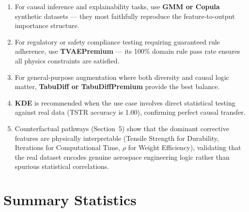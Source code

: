 \documentclass[12pt,a4paper]{article}
\begin{document}
\begin{enumerate}[leftmargin=1.5cm]
  \item For causal inference and explainability tasks, use \textbf{GMM or Copula} synthetic datasets --- they most faithfully reproduce the feature-to-output importance structure.
  \item For regulatory or safety compliance testing requiring guaranteed rule adherence, use \textbf{TVAEPremium} --- its 100\% domain rule pass rate ensures all physics constraints are satisfied.
  \item For general-purpose augmentation where both diversity and causal logic matter, \textbf{TabuDiff or TabuDiffPremium} provide the best balance.
  \item \textbf{KDE} is recommended when the use case involves direct statistical testing against real data (TSTR accuracy is 1.00), confirming perfect causal transfer.
  \item Counterfactual pathways (Section~5) show that the dominant corrective features are physically interpretable (Tensile Strength for Durability, Iterations for Computational Time, $\rho$ for Weight Efficiency), validating that the real dataset encodes genuine aerospace engineering logic rather than spurious statistical correlations.
\end{enumerate}

\section{Summary Statistics}
\end{document}
